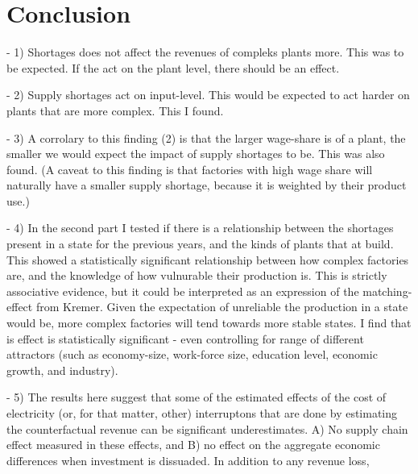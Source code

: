 \documentclass[11pt]{article}
\begin{document}

\newpage

\section{Conclusion}%
\label{sec:conclusion}

- 1) Shortages does not affect the revenues of compleks plants more. This was to be expected. If the act on the plant level, there should be an effect.

- 2) Supply shortages act on input-level. This would be expected to act harder on plants that are more complex. This I found.

- 3) A corrolary to this finding (2) is that the larger wage-share is of a plant, the smaller we would expect the impact of supply shortages to be. This was also found. (A caveat to this finding is that factories with high wage share will naturally have a smaller supply shortage, because it is weighted by their product use.)

- 4) In the second part I tested if there is a relationship between the shortages present in a state for the previous years, and the kinds of plants that at build. This showed a statistically significant relationship between how complex factories are, and the knowledge of how vulnurable their production is. This is strictly associative evidence, but it could be interpreted as an expression of the matching-effect from Kremer. Given the expectation of unreliable the production in a state would be, more complex factories will tend towards more stable states. I find that is effect is statistically significant - even controlling for range of different attractors (such as economy-size, work-force size, education level, economic growth, and industry).

- 5) The results here suggest that some of the estimated effects of the cost of electricity (or, for that matter, other) interruptons that are done by estimating the counterfactual revenue can be significant underestimates. A) No supply chain effect measured in these effects, and B) no effect on the aggregate economic differences when investment is dissuaded. In addition to any revenue loss, 

\end{document}
